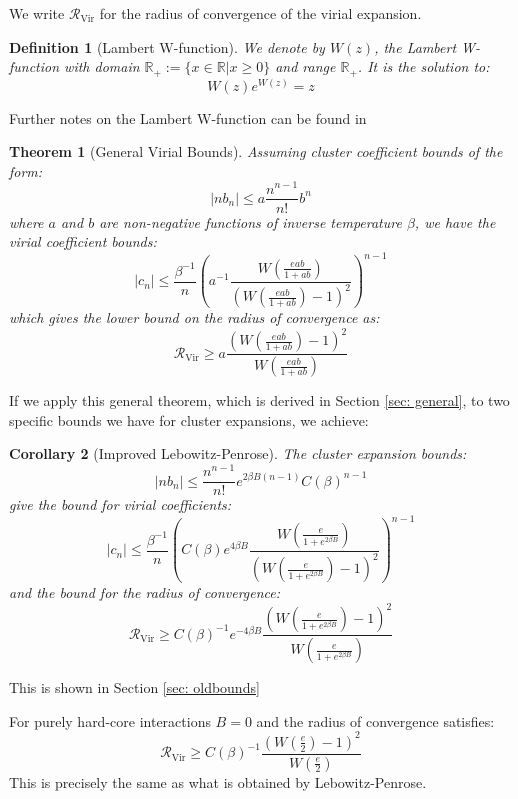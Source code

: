 \documentclass[reqno]{amsart}
\def\be{\begin{equation}}
\def\ee{\end{equation}}
\numberwithin{equation}{section}
\newtheorem{theorem}{Theorem}[section]
\newtheorem{corollary}[theorem]{Corollary}
\newtheorem{definition}{Definition}
\begin{document}
We write $\mathcal{R}_{\text{Vir}}$ for the radius of convergence of the virial expansion.
\begin{definition}[Lambert W-function]
We denote by $W(z)$, the Lambert W-function with domain $\mathbb{R}_+:=\{x \in \mathbb{R} \vert x \geq 0\}$ and range $\mathbb{R}_+$. It is the solution to:
\be W(z) e^{W(z)}=z \ee
\end{definition}

Further notes on the Lambert W-function can be found in \cite{CJK97}

\begin{theorem}[General Virial Bounds]
\label{thm: general}
Assuming cluster coefficient bounds of the form:
\be |nb_n| \leq a \frac{n^{n-1}}{n!}b^n \ee
where $a$ and $b$ are non-negative functions of inverse temperature $\beta$, we have the virial coefficient bounds:
\be |c_n| \leq \frac{\beta^{-1}}{n}\left(a^{-1} \frac{W\left(\frac{eab}{1+ab}\right)}{\left(W\left(\frac{eab}{1+ab}\right)-1\right)^2}\right)^{n-1} \ee
which gives the lower bound on the radius of convergence as:
\be \mathcal{R}_{\text{Vir}} \geq a \frac{\left(W\left(\frac{eab}{1+ab}\right)-1\right)^2}{W\left(\frac{eab}{1+ab}\right)} \ee
\end{theorem} 
If we apply this general theorem, which is derived in Section \ref{sec: general}, to two specific bounds we have for cluster expansions, we achieve:
\begin{corollary}[Improved Lebowitz-Penrose]
\label{cor:lebpenbound}
The cluster expansion bounds:
\be |nb_n| \leq \frac{n^{n-1}}{n!}e^{2\beta B(n-1)}C(\beta)^{n-1} \ee
give the bound for virial coefficients:
\be |c_n| \leq \frac{\beta^{-1}}{n} \left(C(\beta)e^{4\beta B} \frac{W\left(\frac{e}{1+e^{2\beta B}}\right)}{\left(W\left(\frac{e}{1+e^{2\beta B}}\right)-1\right)^2}\right)^{n-1} \ee
and the bound for the radius of convergence:
\be \mathcal{R}_{\text{Vir}} \geq C(\beta)^{-1} e^{-4\beta B}\frac{\left(W\left(\frac{e}{1+e^{2\beta B}}\right)-1\right)^2}{W\left(\frac{e}{1+e^{2\beta B}}\right)} \ee
\end{corollary}
This is shown in Section \ref{sec: oldbounds}

For purely hard-core interactions $B=0$ and the radius of convergence satisfies:
\be \mathcal{R}_{\text{Vir}} \geq C(\beta)^{-1} \frac{\left(W\left(\frac{e}{2}\right)-1\right)^2}{W\left(\frac{e}{2}\right)} \ee
This is precisely the same as what is obtained by Lebowitz-Penrose.
\end{document}

